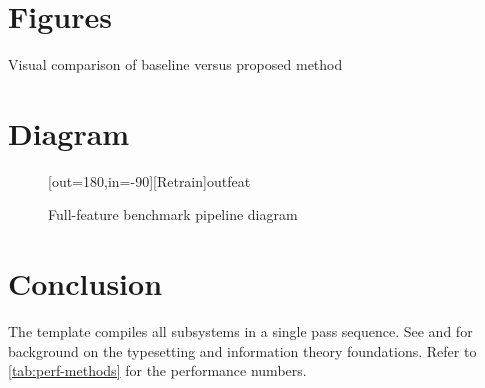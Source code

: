 \documentclass[titlepage=formal,code=listings]{SUSTechHomework}
\begin{document}
\section{Figures}

\begin{sustechfiguregroup}
  \begin{sustechsubfigure}[0.48\linewidth][Baseline]
    \sustechplaceholdergraphic[0.95\linewidth][3.5cm]
  \end{sustechsubfigure}
  \sustechfloatsep
  \begin{sustechsubfigure}[0.48\linewidth][Proposed]
    \sustechplaceholdergraphic[0.95\linewidth][3.5cm]
  \end{sustechsubfigure}
  \caption{Visual comparison of baseline versus proposed method}
\end{sustechfiguregroup}

\section{Diagram}

\begin{figure}[htbp]
  \centering
  \begin{sustechpipelinediagram}

    [out=180,in=-90][Retrain]{out}{feat}
  \end{sustechpipelinediagram}
  \caption{Full-feature benchmark pipeline diagram}
\end{figure}

\section{Conclusion}

The template compiles all subsystems in a single pass sequence.
See \textcite{lamport1994latex} and \parencite{shannon1948mathematical}
for background on the typesetting and information theory foundations.
Refer to \cref{tab:perf-methods} for the performance numbers.

\sustechprintbibliography
\end{document}
